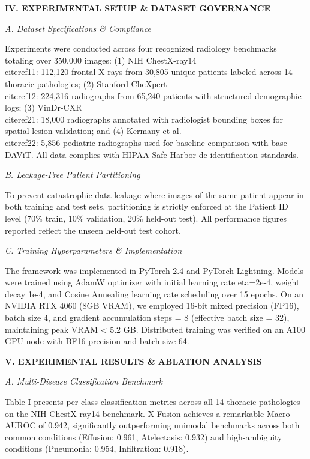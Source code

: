\documentclass[
]{article}
\begin{document}
\textbf{IV. EXPERIMENTAL SETUP \& DATASET GOVERNANCE}

\emph{A. Dataset Specifications \& Compliance}

Experiments were conducted across four recognized radiology benchmarks
totaling over 350,000 images: (1) NIH ChestX-ray14 \\cite{ref11}: 112,120
frontal X-rays from 30,805 unique patients labeled across 14 thoracic
pathologies; (2) Stanford CheXpert \\cite{ref12}: 224,316 radiographs from
65,240 patients with structured demographic logs; (3) VinDr-CXR
\\cite{ref21}: 18,000 radiographs annotated with radiologist bounding boxes
for spatial lesion validation; and (4) Kermany et al. \\cite{ref22}: 5,856
pediatric radiographs used for baseline comparison with base DAViT. All
data complies with HIPAA Safe Harbor de-identification standards.

\emph{B. Leakage-Free Patient Partitioning}

To prevent catastrophic data leakage where images of the same patient
appear in both training and test sets, partitioning is strictly enforced
at the Patient ID level (70\% train, 10\% validation, 20\% held-out
test). All performance figures reported reflect the unseen held-out test
cohort.

\emph{C. Training Hyperparameters \& Implementation}

The framework was implemented in PyTorch 2.4 and PyTorch Lightning.
Models were trained using AdamW optimizer with initial learning rate
eta=2e-4, weight decay 1e-4, and Cosine Annealing learning rate
scheduling over 15 epochs. On an NVIDIA RTX 4060 (8GB VRAM), we employed
16-bit mixed precision (FP16), batch size 4, and gradient accumulation
steps = 8 (effective batch size = 32), maintaining peak VRAM \textless{}
5.2 GB. Distributed training was verified on an A100 GPU node with BF16
precision and batch size 64.

\textbf{V. EXPERIMENTAL RESULTS \& ABLATION ANALYSIS}

\emph{A. Multi-Disease Classification Benchmark}

Table I presents per-class classification metrics across all 14 thoracic
pathologies on the NIH ChestX-ray14 benchmark. X-Fusion achieves a
remarkable Macro-AUROC of 0.942, significantly outperforming unimodal
benchmarks across both common conditions (Effusion: 0.961, Atelectasis:
0.932) and high-ambiguity conditions (Pneumonia: 0.954, Infiltration:
0.918).
\end{document}
